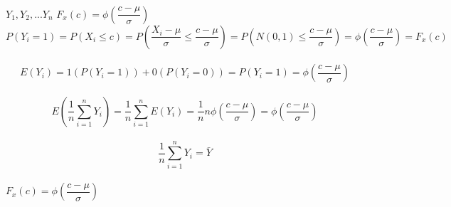 \\  $Y_{1}, Y_{2}, ... Y_{n}$  $F_{x}(c)=\phi(\dfrac{c-\mu}{\sigma}) $
\\ \[ P(Y_{i}=1) = P(X_{i}\leq c) = P(\dfrac{X_{i}-\mu}{\sigma} \leq \dfrac{c-\mu}{\sigma}) = P(N(0,1) \leq \dfrac{c-\mu}{\sigma}) = \phi(\dfrac{c-\mu}{\sigma}) = F_{x}(c) \]
\\ \[ E(Y_{i}) = 1(P(Y_{i}=1)) + 0(P(Y_{i}=0)) = P(Y_{i}=1) = \phi(\dfrac{c-\mu}{\sigma}) \]
\\ \[ E(\dfrac{1}{n}\sum\limits_{i=1}^n Y_{i}) = \dfrac{1}{n}\sum\limits_{i=1}^n E(Y_{i}) = \dfrac{1}{n} n\phi(\dfrac{c-\mu}{\sigma}) = \phi(\dfrac{c-\mu}{\sigma}) \]
\\ \[ \dfrac{1}{n}\sum\limits_{i=1}^n Y_{i} = \bar{Y} \]
\\  $ F_{x}(c) = \phi(\dfrac{c-\mu}{\sigma})$